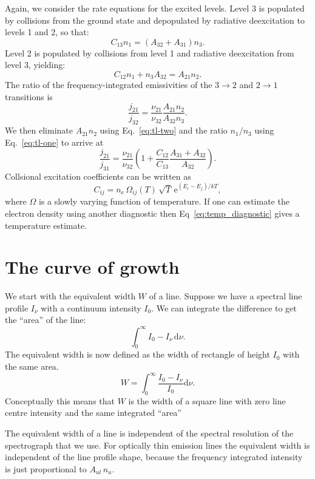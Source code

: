 \documentclass[12pt]{article}
\numberwithin{equation}{section}
\def\exp{\mathrm{e}}
\def\dd{\mathrm{d}}
\def\Inu{\ensuremath{I_{\nu}}}
\def\nelec{\ensuremath{n_\mathrm{e}}}
\newcommand{\be}{\begin{equation}}
\newcommand{\ee}{\end{equation}}
\begin{document}
Again, we consider the rate equations for the excited levels. Level 3 is populated by collisions from the ground state and depopulated by radiative deexcitation to levels 1 and 2, so that:
\be
C_{13} n_1 = \left( A_{32} + A_{31} \right) n_3. \label{eq:tl-one}
\ee
Level 2 is populated by collisions from level 1 and radiative deexcitation from level 3, yielding:
\be
C_{12} n_1 + n_3 A_{32} = A_{21} n_2. \label{eq:tl-two}
\ee
The ratio of the frequency-integrated emissivities of the $3\rightarrow 2$ and $2\rightarrow 1$ transitions is 
\be
\frac{j_{21}}{j_{32}} = \frac{\nu_{21}}{\nu_{32}} \frac{A_{21} n_2}{A_{32} n_3}.
\ee
We then eliminate $A_{21} n_2$ using Eq.~\ref{eq:tl-two} and the ratio $n_1/n_3$ using Eq.~\ref{eq:tl-one} to arrive at
\be
\frac{j_{21}}{j_{31}} = \frac{\nu_{21}}{\nu_{32}} \left( 1 + \frac{C_{12}}{C_{13}} \frac{A_{31} + A_{32}}{A_{32}} \right). \label{eq:temp_diagnostic}
\ee
Collsional excitation coefficients can be written as
\be
C_{ij} = \nelec \, \Omega_{ij}(T) \, \sqrt{T} \, \exp^{ (E_i-E_j)/kT},
\ee
where $\Omega$ is a slowly varying function of temperature. If one can estimate the electron density using another diagnostic then Eq~\ref{eq:temp_diagnostic} gives a temperature estimate.
 
\section{The curve of growth}

We start with the equivalent width $W$ of a line. Suppose we have a spectral line profile $\Inu$ with a continuum intensity $I_0$. We can integrate the difference to get the ``area'' of the line:
\be
\int_0^\infty I_0 - \Inu \,  \dd \nu.
\ee
The equivalent width is now defined as the width of rectangle of height $I_0$ with the same area.
\be 
W = \int_0^\infty \frac{I_0 - \Inu}{I_0} \dd \nu.
\ee
Conceptually this means that $W$ is the width of a square line with zero line centre intensity and the same integrated ``area'' 

The equivalent width of a line is independent of the spectral resolution of the spectrograph that we use. For optically thin emission lines the equivalent width is independent of the line profile shape, because the frequency integrated intensity is just proportional to $A_{ul}\, n_u$. 
 
\end{document}
